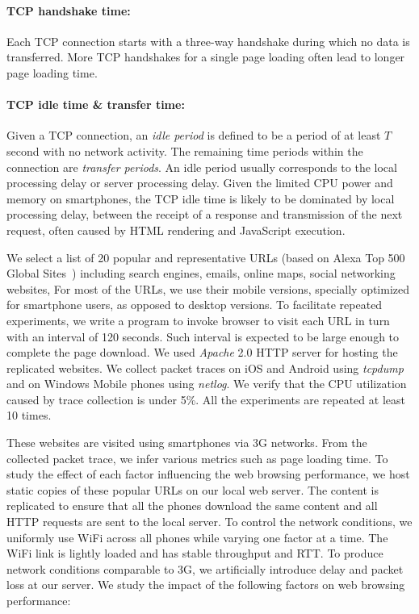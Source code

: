 
\paragraph{TCP handshake time:} Each TCP connection starts with a
three-way handshake during which no data is transferred. More TCP 
handshakes for a single page loading often lead to longer page loading 
time.

\paragraph{TCP idle time \& transfer time:} Given a TCP connection, 
an {\it idle period} is defined to be a period of at least $T$ second 
with no network activity. The remaining time periods within the 
connection are {\it transfer periods}. An idle period usually 
corresponds to the local processing delay or server processing 
delay. Given the limited CPU power and memory on smartphones, the 
TCP idle time is likely to be dominated by local processing delay, 
\eg between the receipt of a response and transmission of the next 
request, often caused by HTML rendering and JavaScript execution.


We select a list of 20 popular and representative URLs (based on Alexa Top 500 Global Sites~\cite{alexa}) including search engines, emails, online maps, social networking websites, \etc
For most of the URLs, we use their mobile versions, specially optimized for smartphone users, as opposed to desktop versions. To facilitate repeated experiments, we write a program to invoke browser to visit each URL in turn with an interval of 120 seconds. Such interval is expected to be large enough to complete the page download. We used \emph{Apache} 2.0 HTTP server for hosting the replicated websites. We collect packet traces on iOS and Android using {\em tcpdump} and on Windows Mobile phones using {\em netlog}. We verify that the CPU utilization caused by trace collection is under 5\%. All the experiments are repeated at least 10 times.

These websites are visited using smartphones via 3G networks. From the collected 
packet trace, we infer various metrics such as page loading time.
To study the effect of each factor influencing the web browsing
performance, we host static copies of these popular URLs on our 
local web server. The content is replicated to ensure that all the 
phones download the same content and all HTTP requests are sent to 
the local server. To control the network conditions, we uniformly 
use WiFi across all phones while varying one factor at a time. 
The WiFi link is lightly loaded and has stable throughput and RTT. 
To produce network conditions comparable to 3G, we artificially 
introduce delay and packet loss at our server. We study the impact 
of the following factors on web browsing performance:

